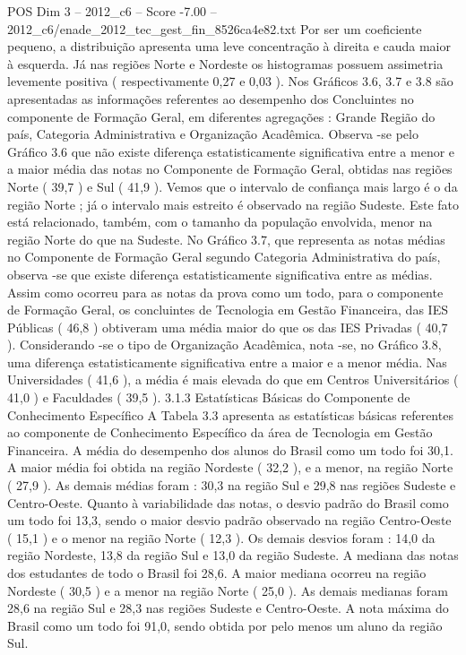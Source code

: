 \begin{textsample}{POS Dim 3 – 2012\_c6 – Score -7.00 – 2012\_c6/enade\_2012\_tec\_gest\_fin\_8526ca4e82.txt}
Por ser um coeficiente pequeno, a distribuição apresenta uma leve concentração à direita e cauda maior à esquerda.
Já nas regiões Norte e Nordeste os histogramas possuem assimetria levemente positiva ( respectivamente 0,27 e 0,03 ).
Nos Gráficos 3.6, 3.7 e 3.8 são apresentadas as informações referentes ao desempenho dos Concluintes no componente de Formação Geral, em diferentes agregações : Grande Região do país, Categoria Administrativa e Organização Acadêmica.
Observa -se pelo Gráfico 3.6 que não existe diferença estatisticamente significativa entre a menor e a maior média das notas no Componente de Formação Geral, obtidas nas regiões Norte ( 39,7 ) e Sul ( 41,9 ).
Vemos que o intervalo de confiança mais largo é o da região Norte ; já o intervalo mais estreito é observado na região Sudeste.
Este fato está relacionado, também, com o tamanho da população envolvida, menor na região Norte do que na Sudeste.
No Gráfico 3.7, que representa as notas médias no Componente de Formação Geral segundo Categoria Administrativa do país, observa -se que existe diferença estatisticamente significativa entre as médias.
Assim como ocorreu para as notas da prova como um todo, para o componente de Formação Geral, os concluintes de Tecnologia em Gestão Financeira, das IES Públicas ( 46,8 ) obtiveram uma média maior do que os das IES Privadas ( 40,7 ).
Considerando -se o tipo de Organização Acadêmica, nota -se, no Gráfico 3.8, uma diferença estatisticamente significativa entre a maior e a menor média.
Nas Universidades ( 41,6 ), a média é mais elevada do que em Centros Universitários ( 41,0 ) e Faculdades ( 39,5 ). 3.1.3 Estatísticas Básicas do Componente de Conhecimento Específico A Tabela 3.3 apresenta as estatísticas básicas referentes ao componente de Conhecimento Específico da área de Tecnologia em Gestão Financeira.
A média do desempenho dos alunos do Brasil como um todo foi 30,1.
A maior média foi obtida na região Nordeste ( 32,2 ), e a menor, na região Norte ( 27,9 ).
As demais médias foram : 30,3 na região Sul e 29,8 nas regiões Sudeste e Centro-Oeste.
Quanto à variabilidade das notas, o desvio padrão do Brasil como um todo foi 13,3, sendo o maior desvio padrão observado na região Centro-Oeste ( 15,1 ) e o menor na região Norte ( 12,3 ).
Os demais desvios foram : 14,0 da região Nordeste, 13,8 da região Sul e 13,0 da região Sudeste.
A mediana das notas dos estudantes de todo o Brasil foi 28,6.
A maior mediana ocorreu na região Nordeste ( 30,5 ) e a menor na região Norte ( 25,0 ).
As demais medianas foram 28,6 na região Sul e 28,3 nas regiões Sudeste e Centro-Oeste.
A nota máxima do Brasil como um todo foi 91,0, sendo obtida por pelo menos um aluno da região Sul.

\end{textsample}
